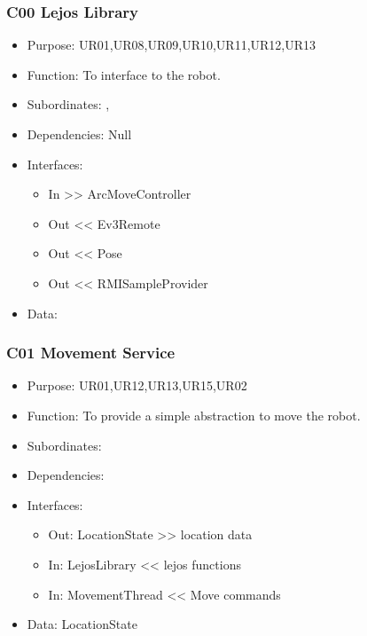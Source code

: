 \subsubsection{C00 Lejos Library}\label{compLejos}
\begin{itemize}
	\item Purpose: UR01,UR08,UR09,UR10,UR11,UR12,UR13
	\item Function: To interface to the robot. 
	\item Subordinates: ,  
	\item Dependencies: Null
	\item Interfaces:
	\begin{itemize}
		\item In >> ArcMoveController
		\item Out << Ev3Remote
		\item Out << Pose
		\item Out << RMISampleProvider
	\end{itemize}
	\item Data:
\end{itemize}

\subsubsection{C01 Movement Service} \label{compMove}
\begin{itemize}
	\item Purpose: UR01,UR12,UR13,UR15,UR02
	\item Function: To provide a simple abstraction to move the robot.
	\item Subordinates: 
	\item Dependencies: 
	\item Interfaces:
	\begin{itemize}
		\item Out: LocationState >> location data
		\item In: LejosLibrary << lejos functions
		\item In: MovementThread << Move commands
	\end{itemize}
	\item Data: LocationState
\end{itemize}

